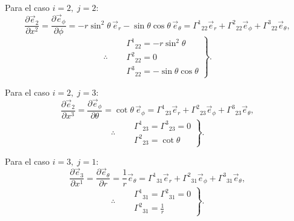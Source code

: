 \documentclass[../apunte_mecanica_clasica.tex]{subfiles}%
\begin{document}
\begin{apuntebloque}{}

Para el caso $i=2, \; j=2$:
\begin{equation*}
    \frac{\partial \vec{e}_2}{\partial x^2} =\frac{\partial \vec{e}_\phi}{\partial \phi} 
    = -r \sin^2\theta \,\vec{e}_r - \sin\theta\cos\theta \,\vec{e}_\theta=\Gamma^1{}_{22}\vec{e}_r+\Gamma^2{}_{22}\vec{e}_\phi+\Gamma^3{}_{22}\vec{e}_\theta,
\end{equation*}
\begin{equation*}
    \therefore \quad
    \left.
    \begin{aligned}
        &\Gamma^1{}_{22}=-r\sin^2\theta \\
        &\Gamma^2{}_{22}=0 \\ 
        &\Gamma^3{}_{22}=-\sin\theta\cos\theta
    \end{aligned}
    \right\}.
\end{equation*}

Para el caso $i=2, \; j=3$:
\begin{equation*}
    \frac{\partial \vec{e}_2}{\partial x^3} =\frac{\partial \vec{e}_\phi}{\partial \theta} = \cot\theta \, \vec{e}_\phi=\Gamma^1{}_{23}\vec{e}_r+\Gamma^2{}_{23}\vec{e}_\phi+\Gamma^3{}_{23}\vec{e}_\theta,
\end{equation*}
\begin{equation*}
    \therefore \quad 
    \left.
    \begin{aligned}
        &\Gamma^1{}_{23} =\Gamma^3{}_{23} = 0 \\
        &\Gamma^2{}_{23} = \cot\theta
    \end{aligned}
    \right\}.
\end{equation*}

Para el caso $i=3, \; j=1$:
\begin{equation*}
    \frac{\partial \vec{e}_3}{\partial x^1} =\frac{\partial \vec{e}_\theta}{\partial r} = \frac{1}{r}\vec{e}_\theta=\Gamma^1{}_{31}\vec{e}_r+\Gamma^2{}_{31}\vec{e}_\phi+\Gamma^3{}_{31}\vec{e}_\theta,
\end{equation*}
\begin{equation*}
    \therefore \quad 
    \left.
    \begin{aligned}
        &\Gamma^1{}_{31} =\Gamma^2{}_{31} = 0 \\
        &\Gamma^2{}_{31} =  \tfrac{1}{r}
    \end{aligned}
    \right\}.
\end{equation*}


\end{apuntebloque}
\end{document}

